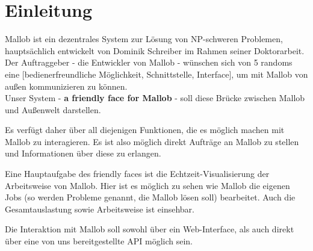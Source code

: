 \section{Einleitung}



Mallob ist ein dezentrales System zur Lösung von NP-schweren Problemen, hauptsächlich entwickelt von Dominik Schreiber im Rahmen seiner Doktorarbeit. Der Auftraggeber - die Entwickler von Mallob - wünschen sich von 5 randoms eine [bedienerfreundliche Möglichkeit, Schnittstelle, Interface], um mit Mallob von außen kommunizieren zu können.\\

Unser System - \textbf{a friendly face for Mallob} - soll diese Brücke zwischen Mallob und Außenwelt darstellen. 

Es verfügt daher über all diejenigen Funktionen, die es möglich machen mit Mallob zu interagieren. Es ist also möglich direkt Aufträge an Mallob zu stellen und Informationen über diese zu erlangen.

Eine Hauptaufgabe des friendly faces ist die Echtzeit-Visualisierung der Arbeitsweise von Mallob. Hier ist es möglich zu sehen wie Mallob die eigenen Jobs (so werden Probleme genannt, die Mallob lösen soll) bearbeitet. Auch die Gesamtauslastung sowie Arbeitsweise ist einsehbar. 

Die Interaktion mit Mallob soll sowohl über ein Web-Interface, als auch direkt über eine von uns bereitgestellte API möglich sein. %

